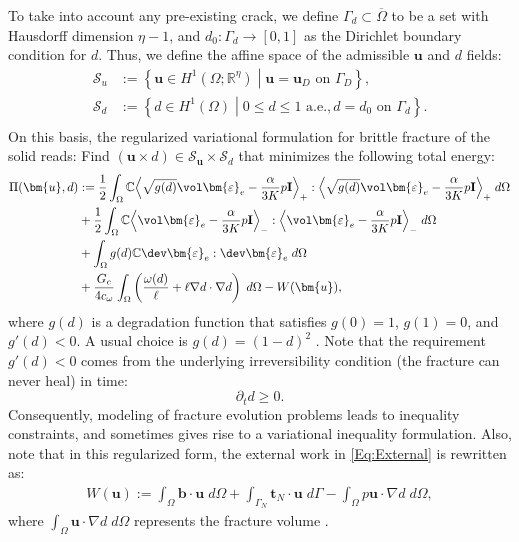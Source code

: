 To take into account any pre-existing crack, we define $\Gamma_d\subset\overline{\Omega}$ to be a set with Hausdorff dimension $\eta-1$, and $d_0:\Gamma_d\rightarrow[0,1]$ as the Dirichlet boundary condition for $d$. Thus, we define the affine space of the admissible $\bm{u}$ and $d$ fields:
\begin{equation}\label{Eq:Dissipative_admissible}
\begin{aligned}
\mathscr{S}_u &:= \left\{\bm{u}\in H^1\left(\Omega; \mathbb{R}^\eta\right) \middle|
\bm{u} = \bm{u}_D \text{ on } \Gamma_D
\right\}, \\
\mathscr{S}_d &:= \left\{d\in H^1(\Omega) \middle|
0 \le d \le 1 \text{ a.e.}, d = d_0 \text{ on } \Gamma_d
\right\}. \\
\end{aligned}
\end{equation}
On this basis, the regularized variational formulation for brittle fracture of the solid reads: Find $\left(\bm{u}\times d \right)\in\mathscr{S}_{\bm{u}}\times\mathscr{S}_d$ that minimizes the following total energy:
\begin{equation}\label{Eq:Dissipative_functional}
\begin{aligned}
\Pi(\bm{u},d)&:= \frac12 \int_{\Omega} \mathbb{C}\Big\langle\sqrt{g(d)}\vol\bm{\varepsilon}_e-\frac{\alpha}{3K}p\mathbf{I}\Big\rangle_{+}:\Big\langle\sqrt{g(d)}\vol\bm{\varepsilon}_e-\frac{\alpha}{3K}p\mathbf{I}\Big\rangle_{+}\; d\Omega \\&+
\frac12\int_{\Omega}\mathbb{C}\Big\langle\vol\bm{\varepsilon}_e-\frac{\alpha}{3K}p\mathbf{I}\Big\rangle_{-}:\Big\langle\vol\bm{\varepsilon}_e-\frac{\alpha}{3K}p\mathbf{I}\Big\rangle_{-}\; d\Omega \\&+
\int_{\Omega} g(d)\mathbb{C}\dev\bm{\varepsilon}_e:\dev\bm{\varepsilon}_e\; d\Omega\\&+
\frac{G_c}{4c_{\omega}}\int_\Omega \left(\frac{\omega(d)}{\ell} + \ell \nabla d\cdot\nabla d\right)\;d\Omega- W(\bm{u}),
\end{aligned}
\end{equation}
where $g(d)$ is a degradation function that satisfies $g(0)=1$, $g(1)=0$, and $g'(d)<0$. A usual choice is $g(d)=(1-d)^2$ \cite{Bourdin2000797}. Note that the requirement $g'(d)<0$ comes from the underlying irreversibility condition (the fracture can never heal) in time:
\begin{equation}\label{Eq:irreversibility}
\partial_t d\geq 0.
\end{equation}
Consequently, modeling of fracture evolution problems leads to {inequality constraints, and sometimes gives rise to a variational inequality formulation}.
Also, note that in this regularized form, the external work in \eqref{Eq:External} is rewritten as:
\begin{equation*}
\begin{aligned}
W(\bm{u}):=\int_{\Omega} \bm{b} \cdot \bm{u} \; d\Omega+\int_{\Gamma_N} \bm{t}_N\cdot \bm{u} \; d\Gamma - \int_{\Omega} p\bm{u}\cdot\nabla d \; d\Omega,
\end{aligned}
\end{equation*}
where $\int_{\Omega} \bm{u}\cdot\nabla d \; d\Omega$ represents the fracture volume \cite{BourdinCFRAC13}.


